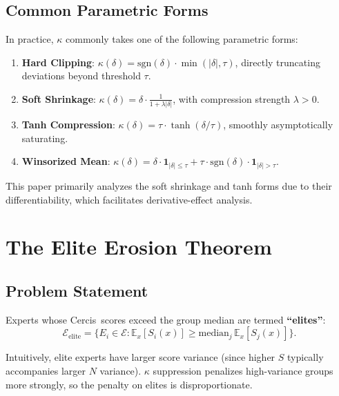 \documentclass[12pt,a4paper]{article}
\theoremstyle{definition}
\newcommand{\E}{\mathbb{E}}
\newcommand{\ind}[1]{\mathbf{1}_{#1}}
\newcommand{\Cercis}{\textsf{Cercis}}
\newcommand{\calE}{\mathcal{E}}
\newcommand{\sgn}{\mathrm{sgn}}
\begin{document}
\subsection{Common Parametric Forms}
\label{sec:param_forms}

In practice, $\kappa$ commonly takes one of the following parametric forms:

\begin{enumerate}[label=(\roman*)]
    \item \textbf{Hard Clipping}: $\kappa(\delta) = \sgn(\delta) \cdot \min(|\delta|, \tau)$, directly truncating deviations beyond threshold $\tau$.
    \item \textbf{Soft Shrinkage}: $\kappa(\delta) = \delta \cdot \frac{1}{1 + \lambda|\delta|}$, with compression strength $\lambda > 0$.
    \item \textbf{Tanh Compression}: $\kappa(\delta) = \tau \cdot \tanh(\delta/\tau)$, smoothly asymptotically saturating.
    \item \textbf{Winsorized Mean}: $\kappa(\delta) = \delta \cdot \ind{|\delta| \leq \tau} + \tau \cdot \sgn(\delta) \cdot \ind{|\delta| > \tau}$.
\end{enumerate}

This paper primarily analyzes the soft shrinkage and tanh forms due to their differentiability, which facilitates derivative-effect analysis.

\section{The Elite Erosion Theorem}
\label{sec:elite_erosion}

\subsection{Problem Statement}

Experts whose \Cercis~scores exceed the group median are termed \textbf{``elites''}:
\begin{equation}
    \calE_{\text{elite}} = \{E_i \in \calE : \E_x[S_i(x)] \geq \text{median}_j\,\E_x[S_j(x)]\}.
\end{equation}

Intuitively, elite experts have larger score variance (since higher $S$ typically accompanies larger $N$ variance). $\kappa$ suppression penalizes high-variance groups more strongly, so the penalty on elites is disproportionate.
\end{document}
